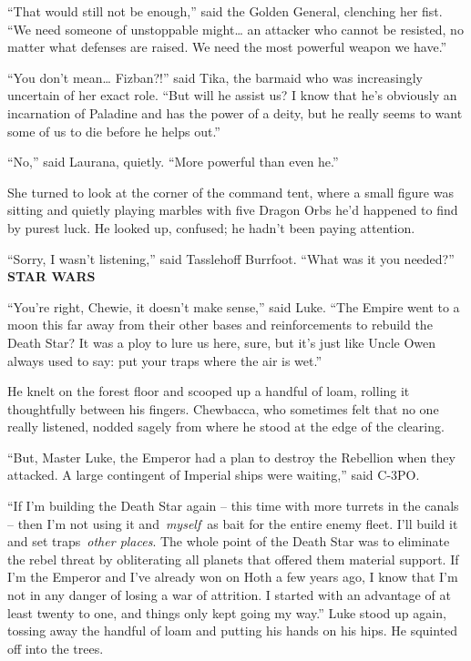 ``That would still not be enough,'' said the Golden General, clenching
her fist. ``We need someone of unstoppable might\ldots{} an attacker who
cannot be resisted, no matter what defenses are raised. We need the most
powerful weapon we have.''

``You don't mean\ldots{} Fizban?!'' said Tika, the barmaid who was
increasingly uncertain of her exact role. ``But will he assist us? I
know that he's obviously an incarnation of Paladine and has the power of
a deity, but he really seems to want some of us to die before he helps
out.''

``No,'' said Laurana, quietly. ``More powerful than even he.''

She turned to look at the corner of the command tent, where a small
figure was sitting and quietly playing marbles with five Dragon Orbs
he'd happened to find by purest luck. He looked up, confused; he hadn't
been paying attention.

``Sorry, I wasn't listening,'' said Tasslehoff Burrfoot. ``What was it
you needed?''\\

\textbf{STAR WARS}

``You're right, Chewie, it doesn't make sense,'' said Luke. ``The Empire
went to a moon this far away from their other bases and reinforcements
to rebuild the Death Star? It was a ploy to lure us here, sure, but it's
just like Uncle Owen always used to say: put your traps where the air is
wet.''

He knelt on the forest floor and scooped up a handful of loam, rolling
it thoughtfully between his fingers. Chewbacca, who sometimes felt that
no one really listened, nodded sagely from where he stood at the edge of
the clearing.

``But, Master Luke, the Emperor had a plan to destroy the Rebellion when
they attacked. A large contingent of Imperial ships were waiting,'' said
C-3PO.

``If I'm building the Death Star again -- this time with more turrets in
the canals -- then I'm not using it and~\emph{myself}~as bait for the
entire enemy fleet. I'll build it and set traps~\emph{other places}. The
whole point of the Death Star was to eliminate the rebel threat by
obliterating all planets that offered them material support. If I'm the
Emperor and I've already won on Hoth a few years ago, I know that I'm
not in any danger of losing a war of attrition. I started with an
advantage of at least twenty to one, and things only kept going my
way.'' Luke stood up again, tossing away the handful of loam and putting
his hands on his hips. He squinted off into the trees.

